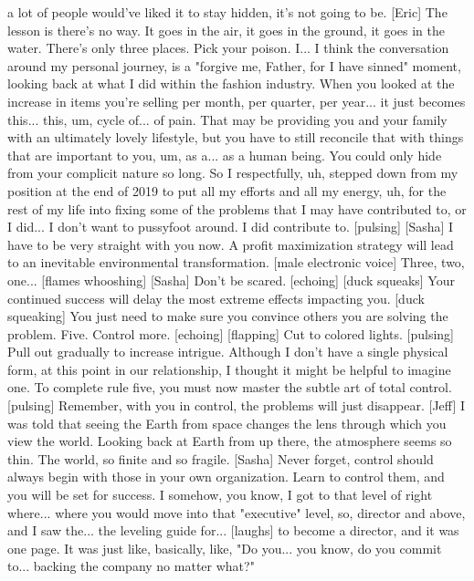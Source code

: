 \documentclass[a4paper]{article}
\begin{document}
	a lot of people would've liked it to stay hidden, it's not going to be.
	[Eric] The lesson is there's no way.
	It goes in the air, it goes in the ground, it goes in the water.
	There's only three places.
	Pick your poison.
	I... I think the conversation around my personal journey,
	is a "forgive me, Father, for I have sinned" moment,
	looking back at what I did within the fashion industry.
	When you looked at the increase in
	items you're selling per month, per quarter, per year...
	it just becomes this...
	this, um, cycle of... of pain.
	That may be providing you and your family with an ultimately lovely lifestyle,
	but you have to still reconcile that with things that are important to you,
	um, as a... as a human being.
	You could only hide from your complicit nature so long.
	So I respectfully, uh, stepped down from my position at the end of 2019
	to put all my efforts and all my energy, uh,
	for the rest of my life into fixing some of the problems
	that I may have contributed to, or I did...
	I don't want to pussyfoot around. I did contribute to.
	[pulsing]
	[Sasha] I have to be very straight with you now.
	A profit maximization strategy
	will lead to an inevitable environmental transformation.
	[male electronic voice] Three, two, one...
	[flames whooshing]
	[Sasha] Don't be scared. [echoing]
	[duck squeaks]
	Your continued success will delay the most extreme effects impacting you.
	[duck squeaking]
	You just need to make sure you convince others
	you are solving the problem.
	Five.
	Control more. [echoing]
	[flapping]
	Cut to colored lights.
	[pulsing]
	Pull out gradually to increase intrigue.
	Although I don't have a single physical form,
	at this point in our relationship,
	I thought it might be helpful to imagine one.
	To complete rule five,
	you must now master the subtle art of total control.
	[pulsing]
	Remember, with you in control, the problems will just disappear.
	[Jeff] I was told that seeing the Earth from space
	changes the lens through which you view the world.
	Looking back at Earth from up there,
	the atmosphere seems so thin.
	The world, so finite and so fragile.
	[Sasha] Never forget,
	control should always begin with those
	in your own organization.
	Learn to control them, and you will be set for success.
	I somehow, you know, I got to that level of right
	where... where you would move into that "executive" level,
	so, director and above,
	and I saw the...
	the leveling guide for... [laughs] to become a director, and it was one page.
	It was just like, basically, like,
	"Do you... you know,
	do you commit to...
	backing the company no matter what?"
\end{document}
